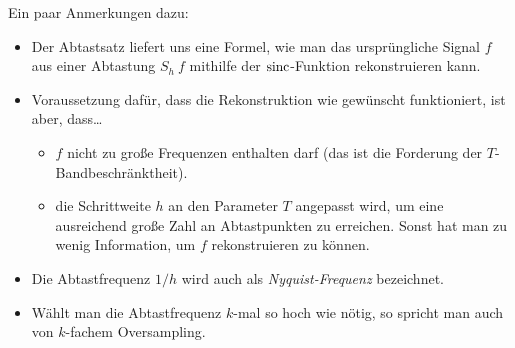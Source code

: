 \begin{remark}
Ein paar Anmerkungen dazu:
\begin{itemize}
\item Der Abtastsatz liefert uns eine Formel, wie man das ursprüngliche Signal $ f $ aus einer
  Abtastung $ S_{h} \ f $ mithilfe der $ \operatorname{sinc} $-Funktion rekonstruieren kann.
\item Voraussetzung dafür, dass die Rekonstruktion wie gewünscht funktioniert, ist aber, dass\dots
  \begin{itemize}
  \item $ f $ nicht zu große Frequenzen enthalten darf (das ist die Forderung der
    $ T $-Bandbeschränktheit).
  \item die Schrittweite $ h $ an den Parameter $ T $ angepasst wird, um eine ausreichend große 
    Zahl an Abtastpunkten zu erreichen. Sonst hat man zu wenig Information, um $ f $ rekonstruieren 
    zu können.
  \end{itemize}
\item Die Abtastfrequenz $ 1 / h $ wird auch als \emph{Nyquist-Frequenz} bezeichnet.
\item Wählt man die Abtastfrequenz $ k $-mal so hoch wie nötig, so spricht man auch von
  $ k $-fachem Oversampling.
\end{itemize}
\end{remark}